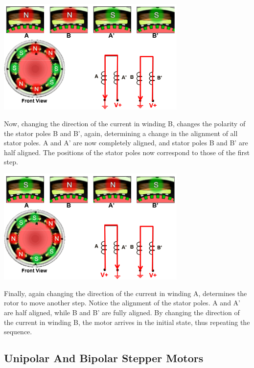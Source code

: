 \begin{center}
	\includegraphics[width=0.7\textwidth]{figures/move/motor34}
	 \cite{figures}
	\label{fig:hybrid_third_step}
\end{center}

Now, changing the direction of the current in winding B, changes the polarity of the stator poles B 
and B', again, determining a change in the alignment of all stator poles. A and A’ are now 
completely aligned, and stator poles B and B’ are half aligned. The positions of the stator poles 
now correspond to those of the first step.

\begin{center}
	\includegraphics[width=0.7\textwidth]{figures/move/motor35}
	 \cite{figures}
	\label{fig:hybrid_forth_step}
\end{center}


Finally, again changing the direction of the current in winding A, determines the rotor to move 
another step. Notice the alignment of the stator poles. A and A’ are half aligned, while B and B’ 
are fully aligned. By changing the direction of the current in winding B, the motor arrives in the 
initial state, thus repeating the sequence.


\subsection{Unipolar And Bipolar Stepper Motors}

